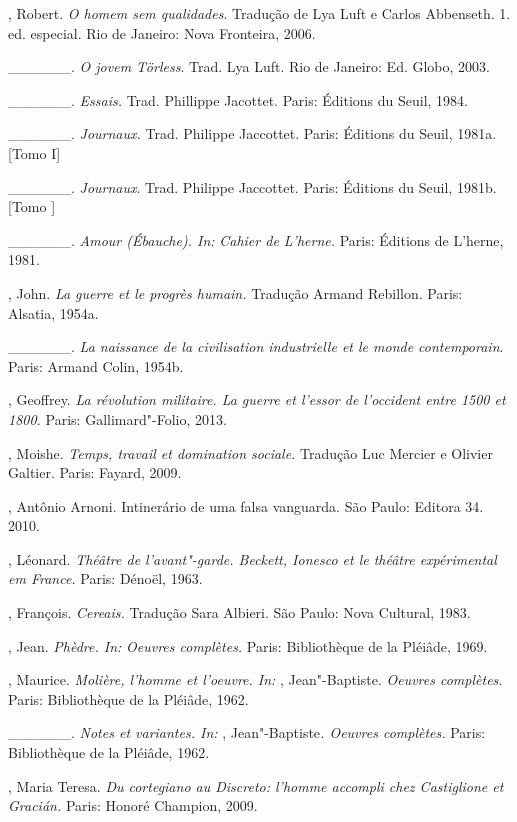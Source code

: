 \begin{Parskip}
, Robert. \emph{O homem sem qualidades}. Tradução de Lya Luft e
Carlos Abbenseth. 1. ed. especial. Rio de Janeiro: Nova Fronteira, 2006.

\_\_\_\_\_\_. \emph{O jovem Törless}. Trad. Lya Luft. Rio de Janeiro:
Ed. Globo, 2003.

\_\_\_\_\_\_. \emph{Essais.} Trad. Phillippe Jacottet. Paris: Éditions
du Seuil, 1984.

\_\_\_\_\_\_. \emph{Journaux.} Trad. Philippe Jaccottet. Paris:
Éditions du Seuil, 1981a. [Tomo I]

\_\_\_\_\_\_. \emph{Journaux}. Trad. Philippe Jaccottet. Paris:
Éditions du Seuil, 1981b. [Tomo ]

\_\_\_\_\_\_. \emph{Amour (Ébauche). In:} \emph{Cahier de L'herne.}
Paris: Éditions de L'herne, 1981.

, John. \emph{La guerre et le progrès humain.} Tradução Armand
Rebillon. Paris: Alsatia, 1954a.

\_\_\_\_\_\_. \emph{La naissance de la civilisation industrielle et le
monde contemporain}. Paris: Armand Colin, 1954b.

, Geoffrey. \emph{La révolution militaire. La guerre et l'essor
de l'occident entre 1500 et 1800.} Paris: Gallimard"-Folio, 2013.

, Moishe. \emph{Temps, travail et domination sociale.} Tradução
Luc Mercier e Olivier Galtier. Paris: Fayard, 2009.

, Antônio Arnoni. Intinerário de uma falsa vanguarda. São Paulo:
Editora 34. 2010.

, Léonard. \emph{Théâtre de l'avant"-garde. Beckett, Ionesco et
le théâtre expérimental em France.} Paris: Dénoël, 1963.

, François. \emph{Cereais.} Tradução Sara Albieri. São Paulo:
Nova Cultural, 1983.

, Jean. \emph{Phèdre. In:} \emph{Oeuvres complètes.} Paris:
Bibliothèque de la Pléiâde, 1969.

, Maurice. \emph{Molière, l'homme et l'oeuvre. In:} ,
Jean"-Baptiste. \emph{Oeuvres complètes.} Paris: Bibliothèque de la
Pléiâde, 1962.

\_\_\_\_\_\_. \emph{Notes et variantes. In:} ,
Jean"-Baptiste\emph{. Oeuvres complètes.} Paris: Bibliothèque de la
Pléiâde, 1962.

, Maria Teresa. \emph{Du cortegiano au Discreto: l'homme accompli
chez Castiglione et Gracián.} Paris: Honoré Champion, 2009.


\end{Parskip}
